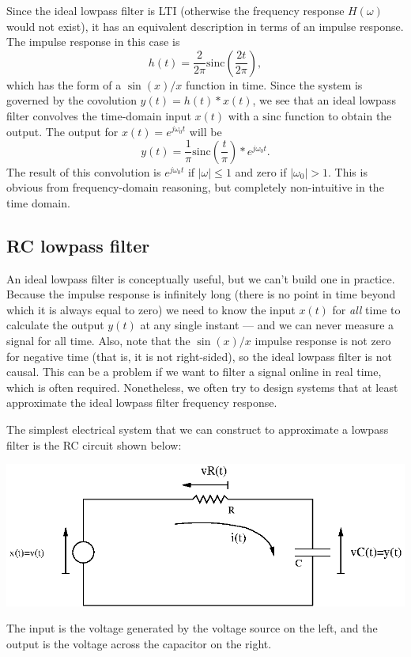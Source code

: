 \documentclass[10pt]{beamer}
\newcommand{\conv}{\ast}
\begin{document}
Since the ideal lowpass filter is LTI (otherwise the frequency response $H(\omega)$ would not exist), it has an equivalent description in terms of an impulse response.  The impulse response in this case is
\begin{equation*}
  h(t) = \frac{2}{2 \pi} \text{sinc} \left( \frac{2 t}{2 \pi} \right),
\end{equation*}
which has the form of a $\sin(x)/x$ function in time.  Since the system is governed by the covolution $y(t) = h(t) \conv x(t)$, we see that an ideal lowpass filter convolves the time-domain input $x(t)$ with a $\text{sinc}$ function to obtain the output.  The output for $x(t) = e^{j \omega_0 t}$ will be
\begin{equation*}
  y(t) = \frac{1}{\pi} \text{sinc} \left( \frac{t}{\pi} \right) \conv e^{j \omega_0 t}.
\end{equation*}
The result of this convolution is $e^{j \omega_0 t}$ if $|\omega| \leq 1$ and zero if $|\omega_0| > 1$.  This is obvious from frequency-domain reasoning, but completely non-intuitive in the time domain.

\subsection{RC lowpass filter}

An ideal lowpass filter is conceptually useful, but we can't build one in practice.  Because the impulse response is infinitely long (there is no point in time beyond which it is always equal to zero) we need to know the input $x(t)$ for {\it all} time to calculate the output $y(t)$ at any single instant --- and we can never measure a signal for all time.  Also, note that the $\sin(x)/x$ impulse response is not zero for negative time (that is, it is not right-sided), so the ideal lowpass filter is not causal.  This can be a problem if we want to filter a signal online in real time, which is often required.  Nonetheless, we often try to design systems that at least approximate the ideal lowpass filter frequency response.

The simplest electrical system that we can construct to approximate a lowpass filter is the RC circuit shown below:
\begin{center}
  \includegraphics{circuitrclowpass}
\end{center}
The input is the voltage generated by the voltage source on the left, and the output is the voltage across the capacitor on the right.
\end{document}
